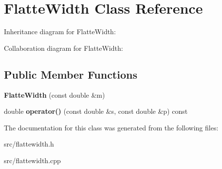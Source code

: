 \hypertarget{class_flatte_width}{}\section{Flatte\+Width Class Reference}
\label{class_flatte_width}


Inheritance diagram for Flatte\+Width\+:


Collaboration diagram for Flatte\+Width\+:
\subsection*{Public Member Functions}
\begin{DoxyCompactItemize}
\item 
\hypertarget{class_flatte_width_a56e7920bf353d13774f12a48d95c056e}{}{\bfseries Flatte\+Width} (const double \&m)\label{class_flatte_width_a56e7920bf353d13774f12a48d95c056e}

\item 
\hypertarget{class_flatte_width_a9baf706946128cdab9280b99e3ab4260}{}double {\bfseries operator()} (const double \&s, const double \&p) const \label{class_flatte_width_a9baf706946128cdab9280b99e3ab4260}

\end{DoxyCompactItemize}


The documentation for this class was generated from the following files\+:\begin{DoxyCompactItemize}
\item 
src/flattewidth.\+h\item 
src/flattewidth.\+cpp\end{DoxyCompactItemize}
